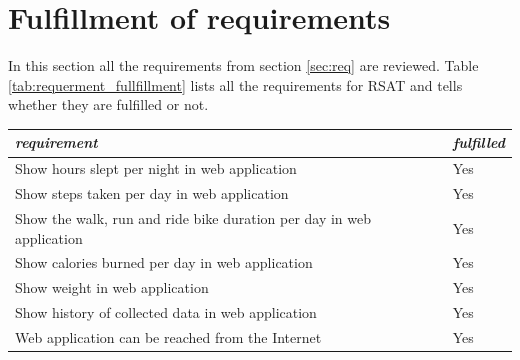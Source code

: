 \documentclass{cslthse-msc}
\begin{document}
\section{Fulfillment of requirements}
In this section all the requirements from section \ref{sec:req} are reviewed. Table \ref{tab:requerment_fullfillment} lists all the requirements for RSAT and tells whether they are fulfilled or not. 


\renewcommand{\arraystretch}{1.2}
\begin{table}[H]
\centering
\begin{tabular}{p{}|p{}}
\emph{requirement} &  \emph{fulfilled}\\ \hline
Show hours slept per night in web application & Yes  \\ 
Show steps taken per day in web application & Yes \\ 
Show the walk, run and ride bike duration per day in web application & Yes \\ 
Show calories burned per day in web application & Yes \\ 
Show weight in web application & Yes \\ 
Show history of collected data in web application & Yes \\
Web application can be reached from the Internet & Yes \\
\end{tabular}
\end{table}
\end{document}
